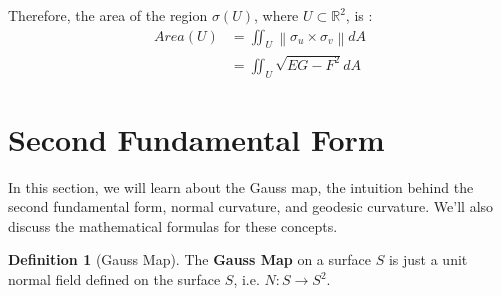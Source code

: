 \documentclass{article}
\theoremstyle{plain}
\theoremstyle{definition}
\newtheorem{definition}{Definition}
\theoremstyle{remark}
\newcommand{\R}{\mathbb{R}}
\begin{document}
Therefore, the area of the region \( \sigma(U) \), where \( U \subset \R^2 \), is :
\begin{align*}
    Area(U) & = \iint_U \left\lVert \sigma_u \times \sigma_v \right\rVert dA\\
            & = \iint_U \sqrt{EG - F^2} dA
\end{align*}

\section{Second Fundamental Form}
In this section, we will learn about the Gauss map, the intuition behind the second fundamental form, normal curvature, and geodesic curvature. We'll also discuss the mathematical formulas for these concepts.

\begin{definition}[Gauss Map]
    The \textbf{Gauss Map} on a surface \(S\) is just a unit normal field defined on the surface \(S\), i.e. \( N: S \rightarrow S^2 \).
\end{definition}
\end{document}
